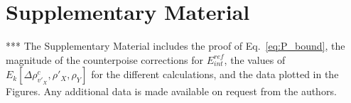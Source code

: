 \documentclass[amsmath,amssymb,preprint,aip,jcp]{revtex4-1}
\begin{document}
\section*{Supplementary Material}
***
The Supplementary Material includes the proof of Eq.~\ref{eq:P_bound}, the magnitude of the counterpoise corrections for $E_{int}^{ref}$, the values of $E_k[\Delta \rho^{c}_{v'_X}, \rho'_X, \rho_Y]$ for the different calculations, and the data plotted in the Figures.
Any additional data is made available on request from the authors.

\end{document}
